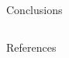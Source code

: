 \documentclass[serif]{beamer}
\begin{document}
\begin{frame}{}
\begin{columns}
\begin{column}[T]{0.3\textwidth}
\vspace{1em}

\begin{block}{Conclusions}


\end{block}

\end{column}

\end{columns}

\vspace{1em}

\begin{block}{References}
\vspace{-1em}
\begin{multicols}{2}

\end{multicols}

%   
%   
\end{block}
\end{frame}
\end{document}
